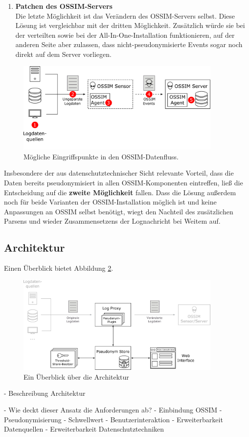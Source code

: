 \begin{enumerate}
\item \textbf{Patchen des OSSIM-Servers}\\
  Die letzte Möglichkeit ist das Verändern des OSSIM-Servers selbst. Diese Lösung ist vergleichbar mit der dritten Möglichkeit. Zusätzlich würde sie bei der verteilten sowie bei der All-In-One-Installation funktionieren, auf der anderen Seite aber zulassen, dass nicht-pseudonymisierte Events sogar noch direkt auf dem Server vorliegen.

\end{enumerate}

\begin{figure}[]
    \centering
        \includegraphics[width=0.9\textwidth]{dia/ossim_data_access_point.pdf}
    \caption{Mögliche Eingriffspunkte in den OSSIM-Datenfluss.}
    \label{fig:ossim_data_access_point}
\end{figure}

Insbesondere der aus datenschutztechnischer Sicht relevante Vorteil, dass die Daten bereits pseudonymisiert in allen OSSIM-Komponenten eintreffen, ließ die Entscheidung auf die \textbf{zweite Möglichkeit} fallen. Dass die Lösung außerdem noch für beide Varianten der OSSIM-Installation möglich ist und keine Anpassungen an OSSIM selbst benötigt, wiegt den Nachteil des zusätzlichen Parsens und wieder Zusammensetzens der Lognachricht bei Weitem auf.

\subsection*{Architektur}

Einen Überblick bietet Abbildung \ref{fig:high__level_architecture}.

\begin{figure}[]
    \centering
        \includegraphics[width=0.9\textwidth]{dia/high_level_architecture.pdf}
    \caption{Ein Überblick über die Architektur}
    \label{fig:high__level_architecture}
\end{figure}

- Beschreibung Architektur

- Wie deckt dieser Ansatz die Anforderungen ab?
  - Einbindung OSSIM
  - Pseudonymisierung
  - Schwellwert
  - Benutzerinteraktion
  - Erweiterbarkeit Datenquellen
  - Erweiterbarkeit Datenschutztechniken